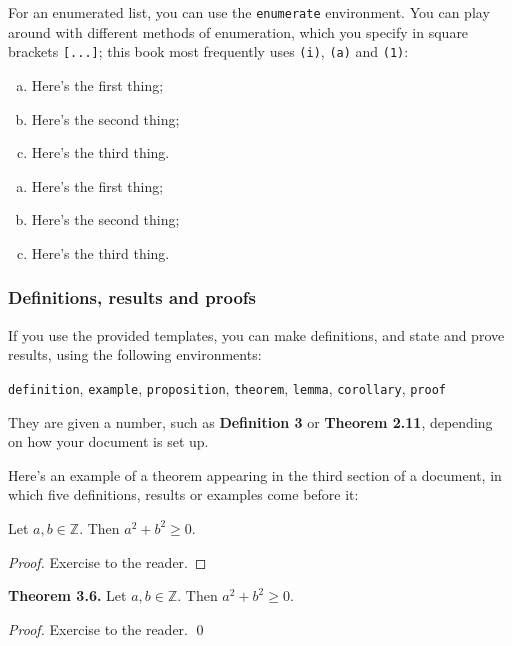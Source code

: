 For an enumerated list, you can use the \lstinline|enumerate| environment. You can play around with different methods of enumeration, which you specify in square brackets \lstinline|[...]|; this book most frequently uses \lstinline|(i)|, \lstinline|(a)| and \lstinline|(1)|:

\begin{texcodeleft}
\begin{enumerate}[(a)]
\item Here's the first thing;
\item Here's the second thing;
\item Here's the third thing.
\end{enumerate}
\end{texcodeleft}
%
\begin{texcoderight}
\begin{enumerate}[(a)]
\item Here's the first thing;
\item Here's the second thing;
\item Here's the third thing.
\end{enumerate}
\end{texcoderight}

\subsubsection*{Definitions, results and proofs}
If you use the provided templates, you can make definitions, and state and prove results, using the following environments:
\begin{center}
\lstinline|definition|, \lstinline|example|, \lstinline|proposition|, \lstinline|theorem|, \lstinline|lemma|, \lstinline|corollary|, \lstinline|proof|
\end{center}
They are given a number, such as \textbf{Definition 3} or \textbf{Theorem 2.11}, depending on how your document is set up.

Here's an example of a theorem appearing in the third section of a document, in which five definitions, results or examples come before it:

\begin{texcodeleft}
\begin{theorem}
Let $a, b \in \mathbb{Z}$. Then $a^2+b^2 \ge 0$.
\end{theorem}

\begin{proof}
Exercise to the reader.
\end{proof}
\end{texcodeleft}
%
\begin{texcoderight}
\textbf{Theorem 3.6.} Let $a, b \in \mathbb{Z}$. Then $a^2+b^2 \ge 0$.

\textit{Proof.} Exercise to the reader. \qed
\end{texcoderight}

